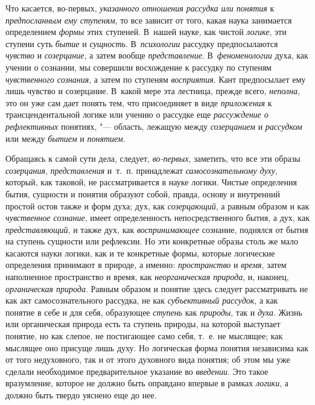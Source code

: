Что касается, во-первых, {\em указанного отношения рассудка или понятия}
к {\em предпосланным ему ступеням}, то все зависит от того, какая наука
занимается определением {\em формы} этих ступеней. В~нашей науке, как
чистой {\em логике}, эти ступени суть {\em бытие} и {\em сущность}.
В~{\em психологии} рассудку предпосылаются {\em чувство} и
{\em созерцание}, а затем вообще {\em представление}. В~{\em феноменологии}
духа, как учении о сознании, мы совершили восхождение к рассудку по
ступеням {\em чувственного сознания}, а затем по ступеням
{\em восприятия}. Кант предпосылает ему лишь чувство и созерцание. В~какой
мере эта лестница, прежде всего, {\em неполна}, это он уже сам дает
понять тем, что присоединяет в виде {\em приложения} к трансцендентальной
логике или учению о рассудке еще {\em рассуждение о рефлективных}
понятиях, "--- область, лежащую между {\em созерцанием} и {\em рассудком}
или между {\em бытием} и {\em понятием}.

Обращаясь к самой сути дела, следует, {\em во-первых},
заметить, что все эти образы {\em созерцания}, {\em представления}
и~т.~п. принадлежат {\em самосознательному духу},
который, как таковой, не рассматривается в науке логики.
Чистые определения бытия, сущности и понятия образуют собой, правда, основу
и внутренний простой остов также и форм духа; дух, как
{\em созерцающий}, а равным образом и как {\em чувственное сознание},
имеет определенность непосредственного бытия, а дух, как {\em представляющий},
и также дух, как {\em воспринимающее}
сознание, поднялся от бытия на ступень сущности или
рефлексии. Но эти конкретные образы столь же мало касаются науки логики,
как и те конкретные формы, которые логические определения принимают в
природе, а именно: {\em пространство} и {\em время},
затем наполненное пространство и время, как
{\em неорганическая природа}, и, наконец, {\em органическая природа}.
Равным образом и понятие здесь следует рассматривать не как
акт самосознательного рассудка, не как {\em субъективный рассудок},
а как понятие в себе и для себя, образующее {\em ступень} как
{\em природы}, так и {\em духа}. Жизнь или
органическая природа есть та ступень природы, на которой выступает понятие,
но как слепое, не постигающее само себя, т.~е. не мыслящее; как мыслящее
оно присуще лишь духу. Но логическая форма понятия независима как от того
недуховного, так и от этого духовного вида понятия; об этом мы уже сделали
необходимое предварительное указание во {\em введении}. Это такое
вразумление, которое не должно быть оправдано впервые в рамках
{\em логики}, а должно быть твердо уяснено еще до нее.

